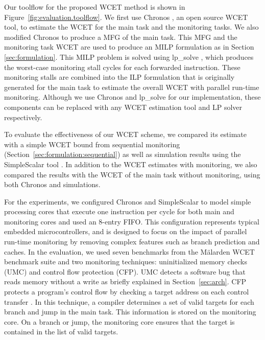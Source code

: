 Our toolflow for the proposed WCET method is shown in Figure~\ref{fig:evaluation.toolflow}. We
first use Chronos \cite{chronos-tool}, an open source WCET tool, to estimate
the WCET for the main task and the monitoring tasks. We also modified Chronos
to produce a MFG of the main task. This MFG and the monitoring task WCET are used to produce an MILP formulation as in
Section \ref{sec:formulation}. This MILP problem is solved
using lp\_solve \cite{lpsolve}, which produces the worst-case monitoring stall cycles for each forwarded
instruction. These monitoring stalls are combined into the ILP formulation that 
is originally generated for the main task to estimate the overall
WCET with parallel run-time monitoring. Although we use Chronos and lp\_solve
for our implementation, these components can be replaced with any WCET
estimation tool and LP solver respectively.

To evaluate the effectiveness of our WCET scheme, we compared its estimate
with a simple WCET bound from sequential monitoring (Section~\ref{sec:formulation:sequential})
as well as simulation results using the SimpleScalar tool \cite{simplescalar}.
In addition to the WCET estimates with monitoring, we also compared the results with
the WCET of the main task without monitoring, using both Chronos and simulations. 


For the experiments, we configured Chronos and SimpleScalar to model simple processing cores
that execute one instruction per cycle for both main and monitoring cores and used an 8-entry FIFO.
This configuration represents typical embedded microcontrollers, and is designed to focus on 
the impact of parallel run-time monitoring by removing complex features such as branch prediction 
and caches.
In the evaluation, we used seven benchmarks from the M\"alarden WCET benchmark suite \cite{malarden} 
and two monitoring techniques: uninitialized memory checks (UMC) and control flow protection (CFP).
UMC detects a software bug that reads memory without a write as briefly explained in 
Section~\ref{sec:arch}. CFP protects a program's control flow by checking a target address on
each control transfer \cite{arora-runtime05}. In this technique, a compiler determines a set of valid
targets for each branch and jump in the main task.
This information is stored on the monitoring core. 
On a branch or jump, the monitoring core ensures that the target is
contained in the list of valid targets.


